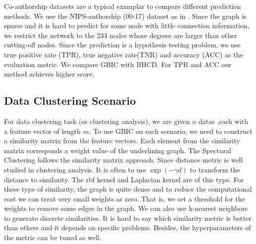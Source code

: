 Co-authorship datasets are a typical examplar to compare different prediction methods. We use the NIPS-authorship (00-17) dataset as in \cite{RN23}.
Since the graph is sparse and it is hard to predict for some node with little connection information, we restrict the network to the 234 nodes whose degrees are larger than other cutting-off nodes. Since the prediction  is a hypothesis testing problem, we use true positive rate (TPR), true negative rate(TNR) and accuracy (ACC) as the evaluation metric. We compare GBIC with BHCD. For TPR and ACC our method achieves higher score.
\begin{table}
\centering

\end{table}

\subsection{Data Clustering Scenario}\label{subsec:dc}
For data clustering task (or clustering analysis), we are given $n$ datas ,each with a feature vector of length $m$. To use GBIC on such scenario, we need to construct a similarity matrix from the feature vectors. Each element from the similarity matrix corresponds a weight value of the underlining graph. The Spectural Clustering follows the similarity matrix approach. Since distance metric is well studied in clustering analysis. It is often to use $\exp(-\gamma d)$ to transform the distance to similarity. The rbf kernel and Laplacian kernel are of this type. For these type of similarity, the graph is quite dense and to reduce the computational cost we can treat very small weights as zero. That is, we set a threshold for the weights to remove some edges in the graph. We can also use k-nearest neighbors to generate discrete similarities. It is hard to say which similarity metric is better than others and it depends on specific problems. Besides, the hyperparameters of the metric can be tuned as well.

